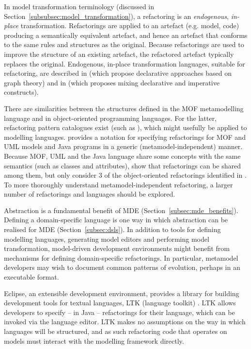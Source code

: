 In model transformation terminology (discussed in Section~\ref{subsubsec:model_transformation}), a refactoring is an \emph{endogenous}, \emph{in-place} transformation. Refactorings are applied to an artefact (e.g. model, code) producing a semantically equivalent artefact, and hence an artefact that conforms to the same rules and structures as the original. Because refactorings are used to improve the structure of an existing artefact, the refactored artefact typically replaces the original. Endogenous, in-place transformation languages, suitable for refactoring, are described in \cite{biermann06refactoring,porres03refactoring} (which propose declarative approaches based on graph theory) and in \cite{kolovos07ewl} (which proposes mixing declarative and imperative constructs).

There are similarities between the structures defined in the MOF metamodelling language and in object-oriented programming languages. For the latter, refactoring pattern catalogues exist (such as \cite{fowler99refactoring}), which might usefully be applied to modelling languages. \cite{moha09refactoring} provides a notation for specifying refactorings for MOF and UML models and Java programs in a generic (metamodel-independent) manner. Because MOF, UML and the Java language share some concepts with the same semantics (such as classes and attributes), \cite{moha09refactoring} show that refactorings can be shared among them, but only consider 3 of the object-oriented refactorings identified in \cite{fowler99refactoring}. To more thoroughly understand metamodel-independent refactoring, a larger number of refactorings and languages should be explored.

Abstraction is a fundamental benefit of MDE (Section~\ref{subsec:mde_benefits}). Defining a domain-specific language is one way in which abstraction can be realised for MDE (Section~\ref{subsec:dsls}). In addition to tools for defining modelling languages, generating model editors and performing model transformation, model-driven development environments might benefit from mechanisms for defining domain-specific refactorings. In particular, metamodel developers may wish to document common patterns of evolution, perhaps in an executable format.

Eclipse, an extensible development environment, provides a library for building development tools for textual languages, LTK (language toolkit) \cite{ltk}. LTK allows developers to specify -- in Java -- refactorings for their language, which can be invoked via the language editor. LTK makes no assumptions on the way in which languages will be structured, and as such refactoring code that operates on models must interact with the modelling framework directly.

